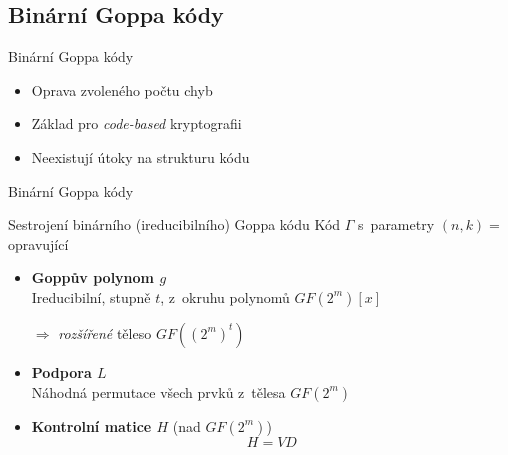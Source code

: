 \documentclass{beamer}
\begin{document}
\subsection{Binární Goppa kódy}

\begin{frame}{Binární Goppa kódy}
    \begin{itemize}

        \item Oprava zvoleného počtu chyb

        \item Základ pro \emph{code-based} kryptografii

        \item Neexistují útoky na strukturu kódu

    \end{itemize}
\end{frame}

\begin{frame}{Binární Goppa kódy}

    \begin{block}{Sestrojení binárního (ireducibilního) Goppa kódu}
        Kód $\Gamma$ s~parametry $(n,k) =$ 
        opravující~
        \begin{itemize}

            \item \textbf{Goppův polynom $g$} \\
                Ireducibilní, stupně $t$, z~okruhu polynomů $GF(2^m)[x]$

                $ \Rightarrow $ \emph{rozšířené} těleso $GF((2^m)^t)$

            \item \textbf{Podpora $L$} \\
                Náhodná permutace všech prvků z~tělesa $GF(2^m)$

            \item \textbf{Kontrolní matice $H$} (nad $GF(2^m)$)
                $$ H = V D $$

        \end{itemize}
    \end{block}

\end{frame}
\end{document}
